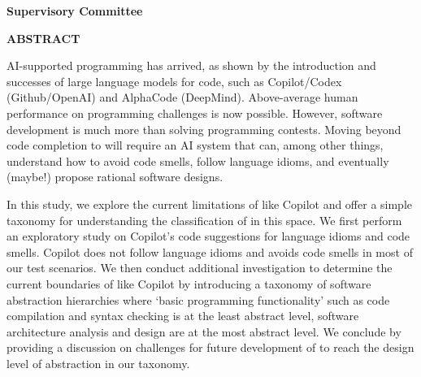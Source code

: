 \newpage
{}

\noindent \textbf{Supervisory Committee}
\tpbreak
\panel

\begin{center}
\textbf{ABSTRACT}
\end{center}

AI-supported programming has arrived, as shown by the introduction and successes of large language models for code, such as Copilot/Codex (Github/OpenAI) and AlphaCode (DeepMind). Above-average human performance on programming challenges is now possible. 
However, software development is much more than solving programming contests. 
Moving beyond code completion to \AISE{} will require an AI system that can, among other things, understand how to avoid code smells, follow language idioms, and eventually (maybe!) propose rational software designs.

In this study, we explore the current limitations of \cct{} like Copilot and offer a simple taxonomy for understanding the classification of \cct{} in this space.
We first perform an exploratory study on Copilot’s code suggestions for language idioms and code smells. Copilot does not follow language idioms and avoids code smells in most of our test scenarios. We then conduct additional investigation to determine the current boundaries of \cct{} like Copilot by introducing a taxonomy of software abstraction hierarchies where ‘basic programming functionality’ such as code compilation and syntax checking is at the least abstract level, software architecture analysis and design are at the most abstract level.
We conclude by providing a discussion on challenges for future development of \cct{} to reach the design level of abstraction in our taxonomy.


